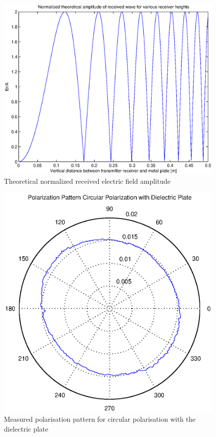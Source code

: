 \documentclass[11pt,a4paper]{article}
\begin{document}
\begin{figure}[h]
\begin{center}
\includegraphics[scale=0.5]{e_zero.eps}
\caption{Theoretical normalized received electric field amplitude}
\label{fig:e_zero}
\end{center}
\end{figure}


\begin{figure}[h]
\begin{center}
\includegraphics[scale=0.5]{2_5circ_pol_dielectric_plate}
\caption{Measured polarisation pattern for circular polarisation with the dielectric plate}
\label{fig:2_5circ_diel}
\end{center}
\end{figure}
\end{document}
